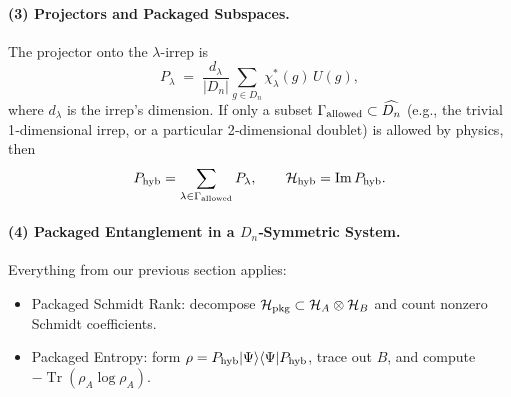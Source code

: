 \documentclass[12pt,a4paper]{article}
\begin{document}
\paragraph{(3) Projectors and Packaged Subspaces.}

The projector onto the $\lambda$-irrep is
$$
P_\lambda
\;=\;
\frac{d_\lambda}{|D_n|}\sum_{g\in D_n}\chi_\lambda^*(g)\,U(g),
$$
where $d_\lambda$ is the irrep’s dimension.
If only a subset $\Gamma_{\rm allowed}\subset\widehat{D_n}$ (e.g., the trivial 1‑dimensional irrep, or a particular 2‑dimensional doublet) is allowed by physics, then
$$
P_{\rm hyb}
=\sum_{\lambda\in\Gamma_{\rm allowed}}P_\lambda,
\qquad
\mathcal H_{\rm hyb}=\operatorname{Im} P_{\rm hyb}.
$$



\paragraph{(4) Packaged Entanglement in a $D_n$‑Symmetric System.}

Everything from our previous section applies:
\begin{itemize}
	\item Packaged Schmidt Rank:
	decompose $\mathcal H_{\rm pkg}\subset\mathcal H_A\otimes\mathcal H_B$ and count nonzero Schmidt coefficients.
	
	\item Packaged Entropy:
	form $\rho=P_{\rm hyb}|\Psi\rangle\langle\Psi|P_{\rm hyb}$, trace out $B$, and compute $- \operatorname{Tr}(\rho_A\log\rho_A)$.
\end{itemize}
\end{document}
